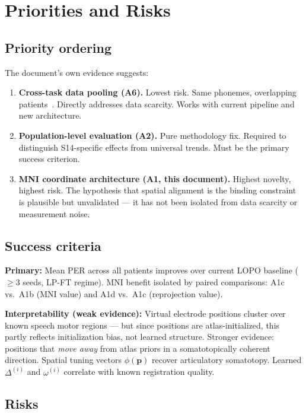 \documentclass[11pt,letterpaper]{article}
\newcommand{\bfp}{\mathbf{p}}
\begin{document}
\section{Priorities and Risks}\label{sec:priorities}

\subsection{Priority ordering}

The document's own evidence suggests:

\begin{enumerate}[leftmargin=2em]
\item \textbf{Cross-task data pooling (A6).} Lowest risk. Same phonemes, overlapping patients~\cite{duraivel2025}. Directly addresses data scarcity. Works with current pipeline and new architecture.

\item \textbf{Population-level evaluation (A2).} Pure methodology fix. Required to distinguish S14-specific effects from universal trends. Must be the primary success criterion.

\item \textbf{MNI coordinate architecture (A1, this document).} Highest novelty, highest risk. The hypothesis that spatial alignment is the binding constraint is plausible but unvalidated --- it has not been isolated from data scarcity or measurement noise.
\end{enumerate}

\subsection{Success criteria}

\textbf{Primary:} Mean PER across all patients improves over current LOPO baseline ($\geq 3$ seeds, LP-FT regime). MNI benefit isolated by paired comparisons: A1c vs.\ A1b (MNI value) and A1d vs.\ A1c (reprojection value).

\textbf{Interpretability (weak evidence):} Virtual electrode positions cluster over known speech motor regions --- but since positions are atlas-initialized, this partly reflects initialization bias, not learned structure. Stronger evidence: positions that \textit{move away} from atlas priors in a somatotopically coherent direction. Spatial tuning vectors $\phi(\bfp)$ recover articulatory somatotopy. Learned $\Delta^{(i)}$ and $\omega^{(i)}$ correlate with known registration quality.

\subsection{Risks}
\end{document}
